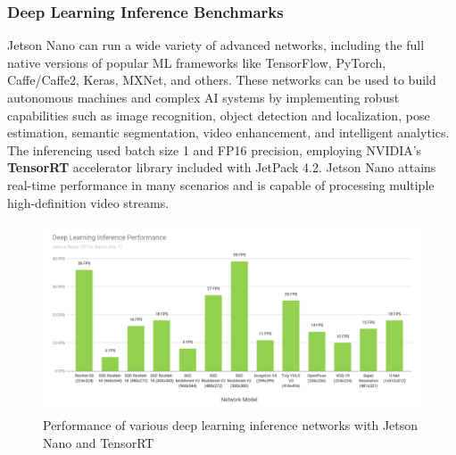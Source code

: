         \subsubsection{Deep Learning Inference Benchmarks}
            Jetson Nano can run a wide variety of advanced networks, including the full native versions of popular ML frameworks like TensorFlow, PyTorch, Caffe/Caffe2, Keras, MXNet, and others. 
            These networks can be used to build autonomous machines and complex AI systems by implementing robust capabilities such as image recognition, object detection and localization, pose 
            estimation, semantic segmentation, video enhancement, and intelligent analytics. \\ 
            \vspace{3mm}
            The inferencing used batch size 1 and FP16 precision, employing NVIDIA’s \textbf{TensorRT} accelerator library included with JetPack 4.2. Jetson Nano attains real-time performance in many 
            scenarios and is capable of processing multiple high-definition video streams.
            \begin{figure}[H]
                \centering
                \includegraphics[width=0.6\linewidth]{img/jetson-nano-inference.png}
                \caption{Performance of various deep learning inference networks with Jetson Nano and TensorRT}
            \end{figure}
